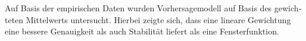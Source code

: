 \begin{otherlanguage}{ngerman}
Auf Basis der empirischen Daten wurden Vorhersagemodell auf Basis des gewichteten Mittelwerts untersucht.
Hierbei zeigte sich, dass eine lineare Gewichtung eine bessere Genauigkeit als auch Stabilität liefert als eine Fensterfunktion.

\end{otherlanguage}
